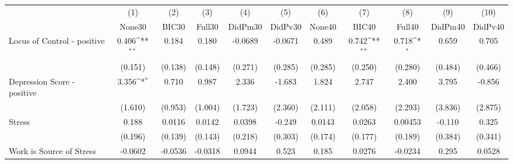 {
\def\sym#1{\ifmmode^{#1}\else\(^{#1}\)\fi}
\begin{tabular}{l*{10}{c}}
\toprule
            &\multicolumn{1}{c}{(1)}&\multicolumn{1}{c}{(2)}&\multicolumn{1}{c}{(3)}&\multicolumn{1}{c}{(4)}&\multicolumn{1}{c}{(5)}&\multicolumn{1}{c}{(6)}&\multicolumn{1}{c}{(7)}&\multicolumn{1}{c}{(8)}&\multicolumn{1}{c}{(9)}&\multicolumn{1}{c}{(10)}\\
            &\multicolumn{1}{c}{None30}&\multicolumn{1}{c}{BIC30}&\multicolumn{1}{c}{Full30}&\multicolumn{1}{c}{DidPm30}&\multicolumn{1}{c}{DidPv30}&\multicolumn{1}{c}{None40}&\multicolumn{1}{c}{BIC40}&\multicolumn{1}{c}{Full40}&\multicolumn{1}{c}{DidPm40}&\multicolumn{1}{c}{DidPv40}\\
\midrule
Locus of Control - positive&       0.406\sym{**} &       0.184         &       0.180         &     -0.0689         &     -0.0671         &       0.489         &       0.742\sym{**} &       0.718\sym{*}  &       0.659         &       0.705         \\
            &     (0.151)         &     (0.138)         &     (0.148)         &     (0.271)         &     (0.285)         &     (0.285)         &     (0.250)         &     (0.280)         &     (0.484)         &     (0.466)         \\
\addlinespace
Depression Score - positive&       3.356\sym{*}  &       0.710         &       0.987         &       2.336         &      -1.683         &       1.824         &       2.747         &       2.400         &       3.795         &      -0.856         \\
            &     (1.610)         &     (0.953)         &     (1.004)         &     (1.723)         &     (2.360)         &     (2.111)         &     (2.058)         &     (2.293)         &     (3.836)         &     (2.875)         \\
\addlinespace
Stress      &       0.188         &      0.0116         &      0.0142         &      0.0398         &      -0.249         &      0.0143         &      0.0263         &     0.00453         &      -0.110         &       0.325         \\
            &     (0.196)         &     (0.139)         &     (0.143)         &     (0.218)         &     (0.303)         &     (0.174)         &     (0.177)         &     (0.189)         &     (0.384)         &     (0.341)         \\
\addlinespace
Work is Source of Stress&     -0.0602         &     -0.0536         &     -0.0318         &      0.0944         &       0.523         &       0.185         &      0.0276         &     -0.0234         &       0.295         &      0.0528         \\

\end{tabular}}
